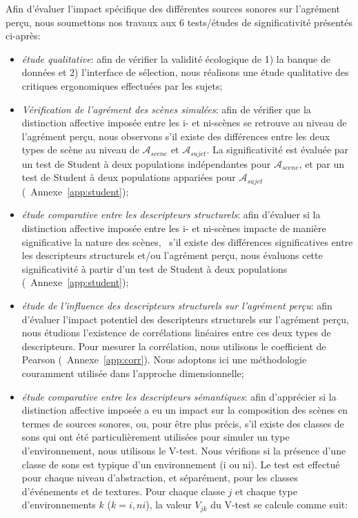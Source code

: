 Afin d'évaluer l'impact spécifique des différentes sources sonores sur l'agrément perçu, nous soumettons nos travaux aux 6 tests/études de significativité présentés ci-après:

\begin{itemize}
\item \emph{étude qualitative}: afin de vérifier la validité écologique de 1) la banque de données et 2) l'interface de sélection, nous réalisons une étude qualitative des critiques ergonomiques effectuées par les sujets;
\item \emph{Vérification de l'agrément des scènes simulées}: afin de vérifier que la distinction affective imposée entre les i- et ni-scènes se retrouve au niveau de l'agrément perçu, nous observons s'il existe des différences entre les deux types de scène au niveau de $\mathcal{A}_{scene}$ et $\mathcal{A}_{sujet}$. La significativité est évaluée par un test de Student à deux populations indépendantes pour $\mathcal{A}_{scene}$, et par un test de Student à deux populations appariées pour $\mathcal{A}_{sujet}$ (\cf~Annexe~\ref{app:student});
\item \emph{étude comparative entre les descripteurs structurels}: afin d'évaluer si la distinction affective imposée entre les i- et ni-scènes impacte de manière significative la nature des scènes, \ie~s'il existe des différences significatives entre les descripteurs structurels et/ou l'agrément perçu, nous évaluons cette significativité à partir d'un test de Student à deux populations (\cf~Annexe~\ref{app:student});
\item \emph{étude de l'influence des descripteurs structurels sur l'agrément perçu}: afin d'évaluer l'impact potentiel des descripteurs structurels sur l'agrément perçu, nous étudions l'existence de corrélations linéaires entre ces deux types de descripteurs. Pour mesurer la corrélation, nous utilisons le coefficient de Pearson (\cf~Annexe~\ref{app:corr}). Nous adoptons ici une méthodologie couramment utilisée dans l'approche dimensionnelle;
\item \emph{étude comparative entre les descripteurs sémantiques}: afin d'apprécier si la distinction affective imposée a eu un impact sur la composition des scènes en termes de sources sonores, ou, pour être plus précis, s'il existe des classes de sons qui ont été particulièrement utilisées pour simuler un type d'environnement, nous utilisons le V-test. Nous vérifions si la présence d'une classe de sons est typique d'un environnement (i ou ni). Le test est effectué pour chaque niveau d'abstraction, et séparément, pour les classes d'événements et de textures. Pour chaque classe $j$ et chaque type d'environnements $k$ ($k={i,ni}$), la valeur $V_{jk}$ du V-test se calcule comme suit: 


\end{itemize}
